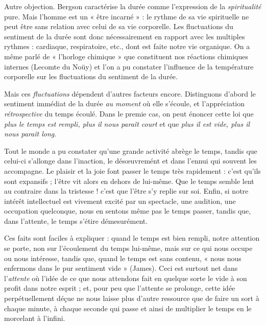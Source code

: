 Autre objection. Bergson caractérise la durée comme l’expression
de la {\it spiritualité} pure. Mais l’homme est un « être incarné » : le rythme
de sa vie spirituelle ne peut être sans relation avec celui de sa vie
corporelle. Les fluctuations du sentiment de la durée sont donc nécessairement
en rapport avec les multiples rythmes : cardiaque, respiratoire,
etc., dont est faite notre vie organique. On a même parlé de
« l’horloge chimique » que constituent nos réactions chimiques internes
(Lecomte du Noüy) et l’on a pu constater l'influence de la température
corporelle sur les fluctuations du sentiment de la durée.

Mais ces {\it fluctuations} dépendent d’autres facteurs encore. Distinguons
d’abord le sentiment immédiat de la durée {\it au moment} où elle
s’écoule, et l’appréciation {\it rétrospective} du temps écoulé. Dans le premie
cas, on peut énoncer cette loi que {\it plus le temps est rempli, plus il nous
paraît court} et que {\it plus il est vide, plus il nous paraît long}.

\vspace{0.24cm}
{\footnotesize Tout le monde a pu constater qu’une grande activité abrège le temps,
tandis que celui-ci s’allonge dans l’inaction, le désœuvremént et dans l’ennui
qui souvent les accompagne. Le plaisir et la joie font passer le temps très
rapidement : c’est qu'ils sont expansifs ; l’être vit alors en dehors de lui-même.
Que le temps semble lent au contraire dans la tristesse ! c’est que
l’être s’y replie sur soi. Enfin, si notre intérêt intellectuel est vivement
excité par un spectacle, une audition, une occupation quelconque, nous en
sentons même pas le temps passer, tandis que, dans l’attente, le temps
s’étire démesurément.}
\vspace{0.31cm}

Ces faits sont faciles à expliquer : quand le temps est bien rempli,
notre attention se porte, non sur l’écoulement du temps lui-même,
mais sur ce qui nous occupe ou nous intéresse, tandis que, quand le
temps est sans contenu, « nous nous enfermons dans le pur sentiment vide »
(James). Ceci est surtout net dans l’{\it attente} où
l’idée de ce que nous attendons fait en quelque sorte le vide à son
profit dans notre esprit ; et, pour peu que l’attente se prolonge, cette
idée perpétuellement déçue ne nous laisse plus d’autre ressource que
de faire un sort à chaque minute, à chaque seconde qui passe et ainsi
de multiplier le temps en le morcelant à l'infini.

